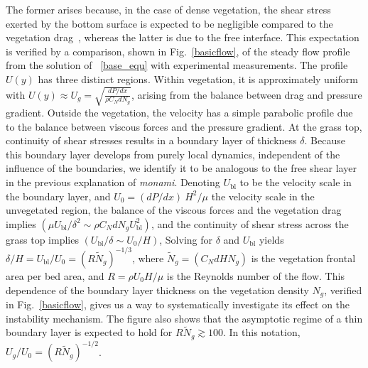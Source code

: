 \documentclass[aps,preprint,12pt]{revtex4-1}  %
\newcommand{\Rey}{{R}}
\newcommand{\Ndg}{\tilde{N}_g}
\newcommand{\monami}{\textit{monami}}
\newcommand{\ubl}{U_\text{bl}}
\begin{document}
The former arises because, in the case of dense vegetation, the shear stress exerted by the bottom surface is expected to be negligible compared to the vegetation drag~\cite{Nepf00}, whereas the latter is due to the free interface. 
This expectation is verified by a comparison, shown in Fig.~\ref{basicflow}, of the steady flow profile from the solution of ~\eqref{base_equ} with experimental measurements.
The profile $U(y)$ has three distinct regions.
Within vegetation, it is approximately uniform with $ U(y) \approx U_g = \sqrt{\frac{dP/dx}{\rho C_N dN_g}}$, arising from the balance between drag and pressure gradient. 
Outside the vegetation, the velocity has a simple parabolic profile due to the balance between viscous forces and the pressure gradient. 
At the grass top, continuity of shear stresses results in a boundary layer of thickness $\delta$. 
Because this boundary layer develops from purely local dynamics, independent of the influence of the boundaries, we identify it to be analogous to the free shear layer \cite{Ghisal02,Nepf04} in the previous explanation of \monami.
Denoting $\ubl$ to be the velocity scale in the boundary layer, and $U_0 = {(dP/dx)~H^2}/{\mu}$ the velocity scale in the unvegetated region, the balance of the viscous forces and the vegetation drag implies $(\mu \ubl/\delta^2 \sim \rho C_N d N_g \ubl^2)$, and the continuity of shear stress across the grass top implies $(\ubl/\delta \sim U_0/H)$,  
Solving for $\delta$ and $\ubl$ yields $\delta/H = \ubl/U_0=(\Rey\Ndg)^{-1/3}$, where $\Ndg = \left(C_N d H N_g\right)$ is the vegetation frontal area per bed area, and $\Rey=\rho U_0 H/\mu$ is the Reynolds number of the flow. 
This dependence of the boundary layer thickness on the vegetation density $N_g$, verified in Fig.~\ref{basicflow}, gives us a way to systematically investigate its effect on the instability mechanism.
The figure also shows that the asymptotic regime of a thin boundary layer is expected to hold for $\Rey \Ndg \gtrsim 100$. In this notation, $U_g/U_0 = (\Rey \Ndg)^{-1/2}$. 
\end{document}
